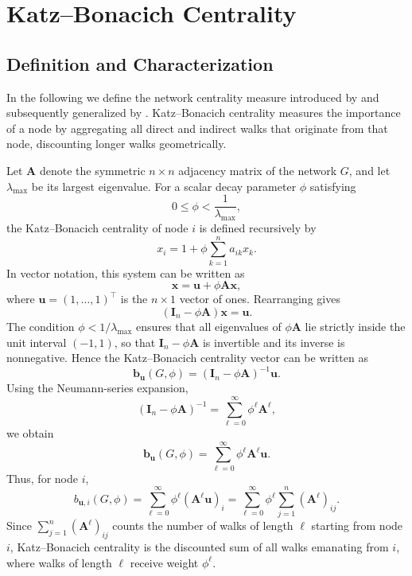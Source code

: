\section{Katz--Bonacich Centrality}

\subsection{Definition and Characterization}
\label{sec:katz-bonacich}
In the following we define the network centrality measure introduced by
\citet{Katz1953} and subsequently generalized by \citet{bonacich1987power}.
Katz--Bonacich centrality measures the importance of a node by aggregating all
direct and indirect walks that originate from that node, discounting longer
walks geometrically.

Let $\mathbf A$ denote the symmetric $n \times n$ adjacency matrix of the
network $G$, and let $\lambda_{\max}$ be its largest eigenvalue. For a scalar
decay parameter $\phi$ satisfying
\[
0 \leq \phi < \frac{1}{\lambda_{\max}},
\]
the Katz--Bonacich centrality of node $i$ is defined recursively by
\begin{equation}
x_i = 1 + \phi \sum_{k=1}^{n} a_{ik} x_k .
\label{eq:katz-bonacich}
\end{equation}
In vector notation, this system can be written as
\[
\mathbf x = \mathbf u + \phi \mathbf A \mathbf x,
\]
where $\mathbf u=(1,\dots,1)^\top$ is the $n \times 1$ vector of ones.
Rearranging gives
\[
(\mathbf I_n-\phi \mathbf A)\mathbf x = \mathbf u .
\]
The condition $\phi < 1/\lambda_{\max}$ ensures that all eigenvalues of
$\phi\mathbf A$ lie strictly inside the unit interval $(-1,1)$, so that
$\mathbf I_n-\phi \mathbf A$ is invertible and its inverse is nonnegative.
Hence the Katz--Bonacich centrality vector can be written as
\begin{equation}
\mathbf b_{\mathbf u}(G,\phi)
=
(\mathbf I_n-\phi \mathbf A)^{-1}\mathbf u .
\label{eq:bonacich-centrality}
\end{equation}
Using the Neumann-series expansion,
\[
(\mathbf I_n-\phi \mathbf A)^{-1}
=
\sum_{\ell=0}^{\infty} \phi^\ell \mathbf A^\ell ,
\]
we obtain
\begin{equation*}
\mathbf b_{\mathbf u}(G,\phi)
=
\sum_{\ell=0}^{\infty} \phi^\ell \mathbf A^\ell \mathbf u .
\end{equation*}
Thus, for node $i$,
\begin{equation}
b_{\mathbf u,i}(G,\phi)
=
\sum_{\ell=0}^{\infty}
\phi^\ell
(\mathbf A^\ell \mathbf u)_i
=
\sum_{\ell=0}^{\infty}
\phi^\ell
\sum_{j=1}^{n}(\mathbf A^\ell)_{ij}.
\label{eq:bonacich-inverse}
\end{equation}
Since $\sum_{j=1}^{n}(\mathbf A^\ell)_{ij}$ counts the number of walks of
length $\ell$ starting from node $i$, Katz--Bonacich centrality is the
discounted sum of all walks emanating from $i$, where walks of length $\ell$
receive weight $\phi^\ell$.

